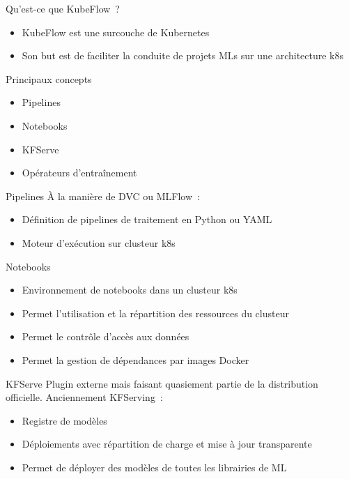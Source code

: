 \begin{frame}{Qu'est-ce que KubeFlow~?}
  \begin{itemize}
    \item KubeFlow est une surcouche de Kubernetes
    \item Son but est de faciliter la conduite de projets MLs sur une architecture k8s
  \end{itemize}
\end{frame}

\begin{frame}{Principaux concepts}
  \begin{itemize}
    \item Pipelines
    \item Notebooks
    \item KFServe
    \item Opérateurs d'entraînement
  \end{itemize}
\end{frame}

\begin{frame}{Pipelines}
  À la manière de DVC ou MLFlow~:
  \begin{itemize}
    \item Définition de pipelines de traitement en Python ou YAML
    \item Moteur d'exécution sur clusteur k8s
  \end{itemize}
\end{frame}

\begin{frame}{Notebooks}
  \begin{itemize}
    \item Environnement de notebooks dans un clusteur k8s
    \item Permet l'utilisation et la répartition des ressources du clusteur
    \item Permet le contrôle d'accès aux données
    \item Permet la gestion de dépendances par images Docker
  \end{itemize}
\end{frame}

\begin{frame}{KFServe}
  Plugin externe mais faisant quasiement partie de la distribution officielle. Anciennement KFServing~:
  \begin{itemize}
    \item Registre de modèles
    \item Déploiements avec répartition de charge et mise à jour transparente
    \item Permet de déployer des modèles de toutes les librairies de ML
  \end{itemize}
\end{frame}

